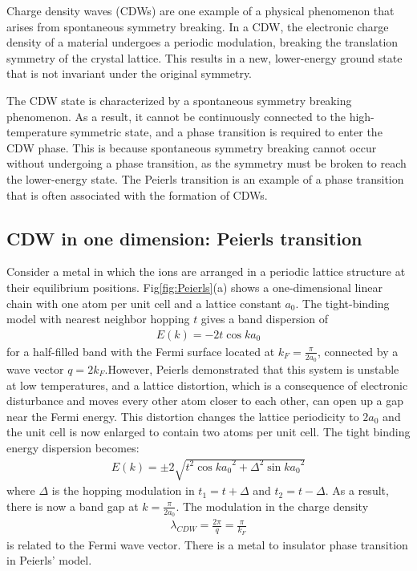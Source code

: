 Charge density waves (CDWs) are one example of a physical phenomenon that arises from spontaneous symmetry breaking. In a CDW, the electronic charge density of a material undergoes a periodic modulation, breaking the translation symmetry of the crystal lattice. This results in a new, lower-energy ground state that is not invariant under the original symmetry. 

The CDW state is characterized by a spontaneous symmetry breaking phenomenon. As a result, it cannot be continuously connected to the high-temperature symmetric state, and a phase transition is required to enter the CDW phase. This is because spontaneous symmetry breaking cannot occur without undergoing a phase transition, as the symmetry must be broken to reach the lower-energy state. The Peierls transition \cite{Peierls1956QuantumTO} is an example of a phase transition that is often associated with the formation of CDWs.

\subsection{CDW in one dimension: Peierls transition}
\label{ch:cdw1d}

 Consider a metal in which the ions are arranged in a periodic lattice structure at their equilibrium positions. Fig\ref{fig:Peierls}(a) shows a one-dimensional linear chain with one atom per unit cell and a lattice constant $a_0$. The tight-binding model with nearest neighbor hopping $t$ gives a band dispersion of
\begin{align}
E(k) = -2t \cos{ka_0}
\end{align}
for a half-filled band with the Fermi surface located at $k_F = \frac{\pi}{2a_0}$, connected by a wave vector $q=2k_F$.However, Peierls demonstrated that this system is unstable at low temperatures, and a lattice distortion, which is a consequence of electronic disturbance and moves every other atom closer to each other, can open up a gap near the Fermi energy. This distortion changes the lattice periodicity to $2a_0$ and the unit cell is now enlarged to contain two atoms per unit cell. The tight binding energy dispersion becomes:
\begin{align}
E(k) = \pm 2\sqrt{t^2\cos{ka_0}^2 + \Delta^2\sin{ka_0}^2}
\end{align}
where $\Delta$ is the hopping modulation in $t_1 = t+\Delta$ and $t_2 = t-\Delta$. As a result, there is now a band gap at $k = \frac{\pi}{2a_0}$. The modulation in the charge density 
\begin{align}
    \lambda_{CDW} = \frac{2\pi}{q} = \frac{\pi}{k_F}
\end{align}
is related to the Fermi wave vector. There is a metal to insulator phase transition in Peierls' model.

